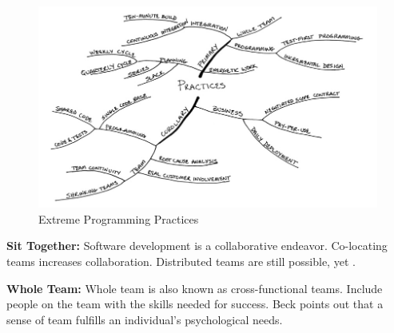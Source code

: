 \begin{figure}[t]
\centering
\includegraphics[width=\twoColumnWidth{}]{extreme_programming_images/summary_of_practices.png}
\caption{Extreme Programming Practices \cite{BeckExtremeProgramming2004}}
\label{XPSummaryOfPractices}
\end{figure}

\textbf{Sit Together:} Software development is a collaborative endeavor. Co-locating teams increases collaboration. Distributed teams are still possible, yet   \cite{BeckExtremeProgramming2004}. 


\textbf{Whole Team:} Whole team is also known as cross-functional teams. Include people on the team with the skills needed for success. Beck points out that a sense of team fulfills an individual's psychological needs.  \cite{BeckExtremeProgramming2004}
 
